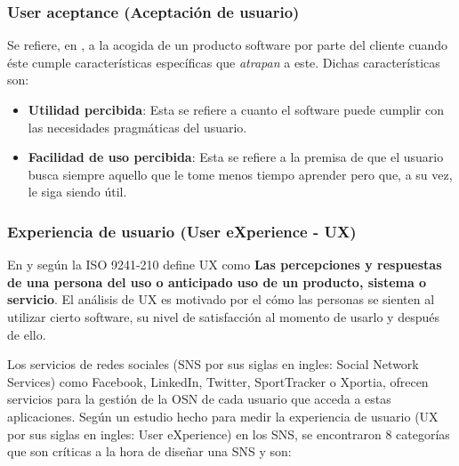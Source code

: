 \subsubsection{User aceptance (Aceptación de usuario)}

Se refiere, en \cite{quality_in_use}, a la acogida de un producto software por parte del cliente cuando éste cumple características específicas que \textit{atrapan} a este. Dichas características son:

\begin{itemize}
 \item \textbf{Utilidad percibida}: Esta se refiere a cuanto el software puede cumplir con las necesidades pragmáticas del usuario.
 \item \textbf{Facilidad de uso percibida}: Esta se refiere a la premisa de que el usuario busca siempre aquello que le tome menos tiempo aprender pero que, a su vez, le siga siendo útil.
\end{itemize}

\subsubsection{Experiencia de usuario (User eXperience - UX)}

En \cite{quality_in_use} y según la ISO 9241-210 define UX como \textbf{Las percepciones y respuestas de una persona del uso o anticipado uso de un producto, sistema o servicio}. El análisis de UX es motivado por el cómo las personas se sienten al utilizar cierto software, su nivel de satisfacción al momento de usarlo y después de ello.

Los servicios de redes sociales (SNS por sus siglas en ingles: Social Network Services) como Facebook, LinkedIn, Twitter, SportTracker o Xportia, ofrecen servicios para la gestión de la OSN de cada usuario que acceda a estas aplicaciones. Según un estudio hecho para medir la experiencia de usuario \cite{user_behavior_online} (UX por sus siglas en ingles: User eXperience) en los SNS, se encontraron 8 categorías que son críticas a la hora de diseñar una SNS y son:


